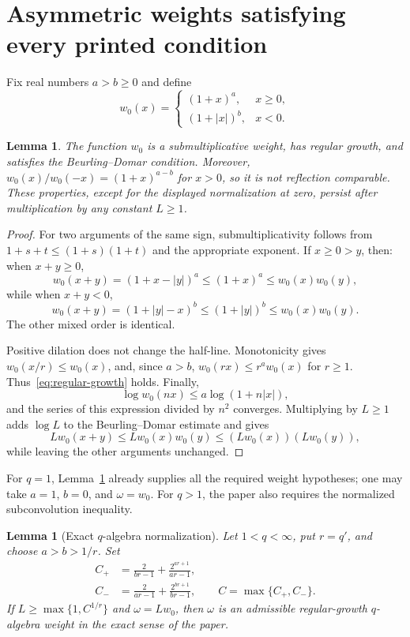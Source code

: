 \documentclass[11pt]{article}
\newtheorem{lemma}[theorem]{Lemma}
\begin{document}
\section{Asymmetric weights satisfying every printed condition}

Fix real numbers $a>b\ge0$ and define
\begin{equation}\label{eq:w0}
 w_0(x)=
 \begin{cases}
  (1+x)^a,&x\ge0,\\
  (1+|x|)^b,&x<0.
 \end{cases}
\end{equation}

\begin{lemma}\label{lem:basic-weight}
The function $w_0$ is a submultiplicative weight, has regular growth, and
satisfies the Beurling--Domar condition.  Moreover,
$w_0(x)/w_0(-x)=(1+x)^{a-b}$ for $x>0$, so it is not reflection comparable.
These properties, except for the displayed normalization at zero, persist
after multiplication by any constant $L\ge1$.
\end{lemma}

\begin{proof}
For two arguments of the same sign, submultiplicativity follows from
$1+s+t\le(1+s)(1+t)$ and the appropriate exponent.  If $x\ge0>y$, then:
when $x+y\ge0$,
\[
 w_0(x+y)=(1+x-|y|)^a\le(1+x)^a\le w_0(x)w_0(y),
\]
while when $x+y<0$,
\[
 w_0(x+y)=(1+|y|-x)^b\le(1+|y|)^b\le w_0(x)w_0(y).
\]
The other mixed order is identical.

Positive dilation does not change the half-line.  Monotonicity gives
$w_0(x/r)\le w_0(x)$, and, since $a>b$,
$w_0(rx)\le r^a w_0(x)$ for $r\ge1$.  Thus~\eqref{eq:regular-growth}
holds.  Finally,
\[
 \log w_0(nx)\le a\log(1+n|x|),
\]
and the series of this expression divided by $n^2$ converges.  Multiplying
by $L\ge1$ adds $\log L$ to the Beurling--Domar estimate and gives
\[
 Lw_0(x+y)\le Lw_0(x)w_0(y)\le (Lw_0(x))(Lw_0(y)),
\]
while leaving the other arguments unchanged.
\end{proof}

For $q=1$, Lemma~\ref{lem:basic-weight} already supplies all the required
weight hypotheses; one may take $a=1$, $b=0$, and $\omega=w_0$.  For
$q>1$, the paper also requires the normalized subconvolution inequality.

\begin{lemma}[Exact $q$-algebra normalization]\label{lem:qweight}
Let $1<q<\infty$, put $r=q'$, and choose $a>b>1/r$.  Set
\begin{align*}
 C_+&=\frac{2}{br-1}+\frac{2^{ar+1}}{ar-1},\\
 C_-&=\frac{2}{ar-1}+\frac{2^{br+1}}{br-1},
 \qquad C=\max\{C_+,C_-\}.
\end{align*}
If $L\ge\max\{1,C^{1/r}\}$ and $\omega=Lw_0$, then $\omega$ is an
admissible regular-growth $q$-algebra weight in the exact sense of the
paper.
\end{lemma}
\end{document}

